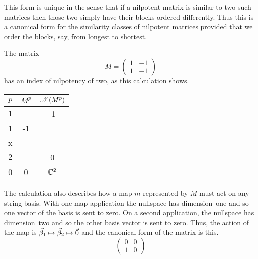 This form is unique in the sense that if a nilpotent matrix is similar to two
such matrices then those two simply have their blocks ordered differently.
Thus this is
a canonical form for the similarity classes of nilpotent matrices
provided that we order the blocks, say, from longest to shortest.

\begin{example}
The matrix
\begin{equation*}
  M=\begin{pmatrix}
      1  &-1  \\
      1  &-1
    \end{pmatrix}
\end{equation*}
has an index of nilpotency of two, as this calculation shows.
\begin{center}
  \begin{tabular}{c|cc}
    \( p \)  &\( M^p \)  &\( \mathscr{N}(M^p)  \)   \\  \hline
    \( 1 \)
    &\(  M=\begin{pmatrix}
         1  &-1  \\
         1  &-1
       \end{pmatrix}  \)
    &\( \set{\colvec{x \\ x}\suchthat
                               x\in\C}  \)   \\[2ex]
    \( 2 \)
    &\(  M^2=\begin{pmatrix}
         0  &0   \\
         0  &0
       \end{pmatrix}  \)
    &\( \mathbb{C}^2  \)
  \end{tabular}
\end{center}
The calculation also describes how a map $m$ represented by $M$ must act on any
string basis.
With one map application the nullspace has dimension~one and so one
vector of the basis is sent to zero.
On a second application, the nullspace has dimension~two and so
the other basis vector is sent to zero. 
Thus, the action of the map is
$\vec{\beta}_1\mapsto\vec{\beta}_2\mapsto\vec{0}$ 
and the canonical form of the matrix is this.
\begin{equation*}
  \begin{pmatrix}
    0  &0  \\
    1  &0
  \end{pmatrix}
\end{equation*}


\end{example}
